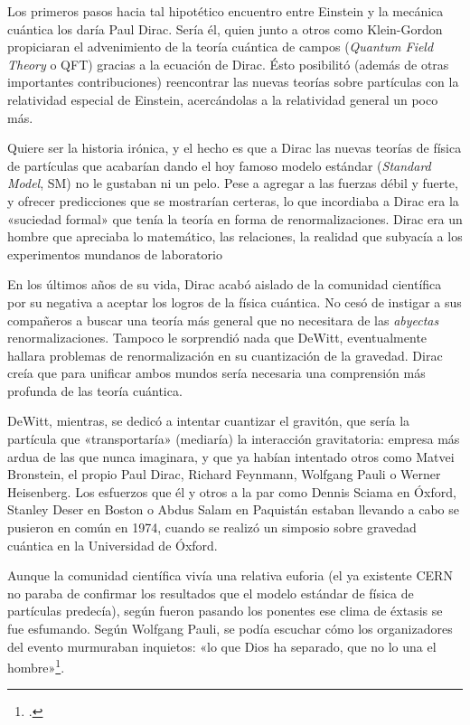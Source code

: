 \documentclass[11pt,a4paper,titlepage]{article}
\begin{document}
\par Los primeros pasos hacia tal hipotético encuentro entre Einstein y la mecánica cuántica los daría Paul Dirac. Sería él, quien junto a otros como Klein-Gordon propiciaran el advenimiento de la teoría cuántica de campos (\textit{Quantum Field Theory} o QFT) gracias a la ecuación de Dirac. Ésto posibilitó (además de otras importantes contribuciones) reencontrar las nuevas teorías sobre partículas con la relatividad especial de Einstein, acercándolas a la relatividad general un poco más.
\par Quiere ser la historia irónica, y el hecho es que a Dirac las nuevas teorías de física de partículas que acabarían dando el hoy famoso modelo estándar (\textit{Standard Model}, SM) no le gustaban ni un pelo. Pese a agregar a las fuerzas débil y fuerte, y ofrecer predicciones que se mostrarían certeras, lo que incordiaba a Dirac era la «suciedad formal» que tenía la teoría en forma de renormalizaciones. Dirac era un hombre que apreciaba lo matemático, las relaciones, la realidad que subyacía a los experimentos mundanos de laboratorio
\par En los últimos años de su vida, Dirac acabó aislado de la comunidad científica por su negativa a aceptar los logros de la física cuántica. No cesó de instigar a sus compañeros a buscar una teoría más general que no necesitara de las \textit{abyectas} renormalizaciones. Tampoco le sorprendió nada que DeWitt, eventualmente hallara problemas de renormalización en su cuantización de la gravedad. Dirac creía que para unificar ambos mundos sería necesaria una comprensión más profunda de las teoría cuántica.
\\\par DeWitt, mientras, se dedicó a intentar cuantizar el gravitón, que sería la partícula que «transportaría» (mediaría) la interacción gravitatoria: empresa más ardua de las que nunca imaginara, y que ya habían intentado otros como Matvei Bronstein, el propio Paul Dirac, Richard Feynmann, Wolfgang Pauli o Werner Heisenberg. Los esfuerzos que él y otros a la par como Dennis Sciama en Óxford, Stanley Deser en Boston o Abdus Salam en Paquistán estaban llevando a cabo se pusieron en común en 1974, cuando se realizó un simposio sobre gravedad cuántica en la Universidad de Óxford.
\par Aunque la comunidad científica vivía una relativa euforia (el ya existente CERN no paraba de confirmar los resultados que el modelo estándar de física de partículas predecía), según fueron pasando los ponentes ese clima de éxtasis se fue esfumando. Según Wolfgang Pauli, se podía escuchar cómo los organizadores del evento murmuraban inquietos: «lo que Dios ha separado, que no lo una el hombre»\footnote{\cite[p.~242]{teoriaperfecta}.}.
\end{document}
